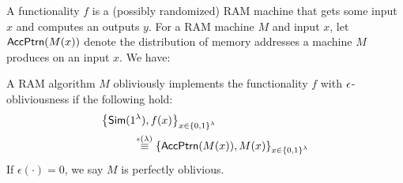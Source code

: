 A functionality $f$ is a (possibly randomized) RAM machine that gets some input $x$ and computes an outputs $y$. For a  RAM machine $M$ and input $x$, let ${\sf AccPtrn}(M(x))$ denote the distribution of memory addresses a machine $M$ produces on an input $x$.
We have:
\begin{definition}
A RAM algorithm $M$ obliviously implements the functionality $f$ with ${\epsilon}$-obliviousness if the following hold:
\begin{eqnarray*}
\hspace{-5ex}\lefteqn{\left\{\Sim(1^\lambda),f(x)\right\}_{x \in \bit^\lambda}} \\
&&\hspace{+5ex}\overset{\epsilon(\lambda)}{\equiv} \left\{ {\sf AccPtrn}(M(x)),M(x)\right\}_{x \in \bit^\lambda}
\end{eqnarray*}
If $\epsilon(\cdot)=0$, we say $M$ is perfectly oblivious. 
\end{definition}

%
%

